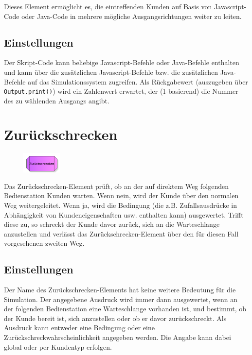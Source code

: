 Dieses Element ermöglicht es, die eintreffenden Kunden auf Basis von Javascript-Code
oder Java-Code in mehrere mögliche Ausgangsrichtungen weiter zu leiten.

\subsection*{Einstellungen}

Der Skript-Code kann beliebige Javascript-Befehle oder Java-Befehle enthalten
und kann über die zusätzlichen Javascript-Befehle bzw.
die zusätzlichen Java-Befehle auf das Simulationssystem
zugreifen. Als Rückgabewert (auszugeben über \texttt{Output.print()}) wird ein Zahlenwert
erwartet, der (1-basierend) die Nummer des zu wählenden Ausgangs angibt.


\section{Zurückschrecken}
\label{ref:ModelElementBalking}

\begin{figure}
\vspace{-22pt}
\includegraphics[width=2cm]{imageModelElementBalking.png}
\vspace{-22pt}
\end{figure}

Das Zurückschrecken-Element prüft, ob an der auf direktem Weg folgenden Bedienstation Kunden warten.
Wenn nein, wird der Kunde über den normalen Weg weitergeleitet.
Wenn ja, wird die Bedingung (die z.B. Zufallsausdrücke in Abhängigkeit von Kundeneigenschaften usw.
enthalten kann) ausgewertet. Trifft diese zu, so schreckt der Kunde davor zurück, sich an die
Warteschlange anzustellen und verlässt das Zurückschrecken-Element über den für diesen Fall
vorgesehenen zweiten Weg.

\subsection*{Einstellungen}

Der Name des Zurückschrecken-Elements hat keine weitere Bedeutung für die Simulation.
Der angegebene Ausdruck wird immer dann ausgewertet, wenn an der folgenden Bedienstation
eine Warteschlange vorhanden ist, und bestimmt, ob der Kunde bereit ist, sich anzustellen
oder ob er davor zurückschreckt. Als Ausdruck kann entweder eine Bedingung oder eine
Zurückschreckwahrscheinlichkeit angegeben werden. Die Angabe kann dabei global oder per
Kundentyp erfolgen.





